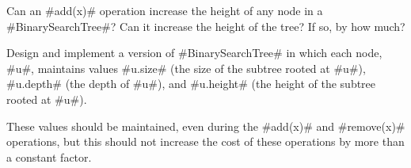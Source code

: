 \begin{exc}
  Can an #add(x)# operation increase the height of any node in a
  #BinarySearchTree#?  Can it increase the height of the tree?  If so,
  by how much?
\end{exc}

\begin{exc}
  Design and implement a version of #BinarySearchTree# in which each node,
  #u#, maintains values #u.size# (the size of the subtree rooted at #u#),
  #u.depth# (the depth of #u#), and #u.height# (the height of the subtree
  rooted at #u#).  

  These values should be maintained, even during the #add(x)# and
  #remove(x)# operations, but this should not increase the cost of these
  operations by more than a constant factor.
\end{exc}
